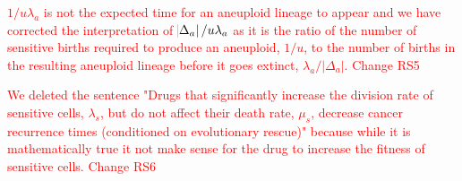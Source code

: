 \documentclass[12pt]{extarticle}
\begin{document}
\textcolor{red}{$1/u\lambda_a$ is not the expected time for an aneuploid lineage to appear and we have corrected the interpretation of $\abs{\Delta_a}/u\lambda_a$ as it is the ratio of the number of sensitive births required to produce an aneuploid, $1/u$, to the number of births in the resulting aneuploid lineage before it goes extinct, $\lambda_a / |\Delta_a|$. Change RS5}

\textcolor{red}{We deleted the sentence "Drugs that significantly increase the division rate of sensitive cells, $\lambda_s$, but do not affect their death rate, $\mu_s$, decrease cancer recurrence times (conditioned on evolutionary rescue)" because while it is mathematically true it not make sense for the drug to increase the fitness of sensitive cells. Change RS6}








\end{document}
